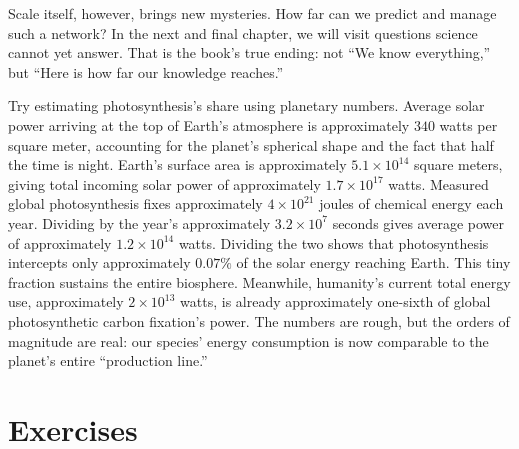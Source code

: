 Scale itself, however, brings new mysteries. How far can we predict and manage such a network? In the next and final chapter, we will visit questions science cannot yet answer. That is the book's true ending: not ``We know everything,'' but ``Here is how far our knowledge reaches.''

\begin{tiaozhan}
Try estimating photosynthesis's share using planetary numbers. Average solar power arriving at the top of Earth's atmosphere is approximately $340$ watts per square meter, accounting for the planet's spherical shape and the fact that half the time is night. Earth's surface area is approximately $5.1\times 10^{14}$ square meters, giving total incoming solar power of approximately $1.7\times 10^{17}$ watts. Measured global photosynthesis fixes approximately $4\times 10^{21}$ joules of chemical energy each year. Dividing by the year's approximately $3.2\times 10^7$ seconds gives average power of approximately $1.2\times 10^{14}$ watts. Dividing the two shows that photosynthesis intercepts only approximately $0.07\%$ of the solar energy reaching Earth. This tiny fraction sustains the entire biosphere. Meanwhile, humanity's current total energy use, approximately $2\times 10^{13}$ watts, is already approximately one-sixth of global photosynthetic carbon fixation's power. The numbers are rough, but the orders of magnitude are real: our species' energy consumption is now comparable to the planet's entire ``production line.''
\end{tiaozhan}

\section*{Exercises}


